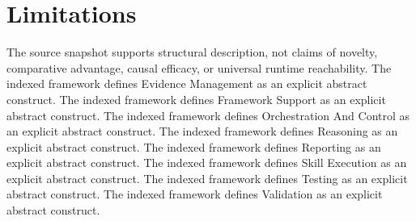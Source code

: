 \section{Limitations}

The source snapshot supports structural description, not claims of novelty, comparative advantage, causal efficacy, or universal runtime reachability. The indexed framework defines Evidence Management as an explicit abstract construct. The indexed framework defines Framework Support as an explicit abstract construct. The indexed framework defines Orchestration And Control as an explicit abstract construct. The indexed framework defines Reasoning as an explicit abstract construct. The indexed framework defines Reporting as an explicit abstract construct. The indexed framework defines Skill Execution as an explicit abstract construct. The indexed framework defines Testing as an explicit abstract construct. The indexed framework defines Validation as an explicit abstract construct.

